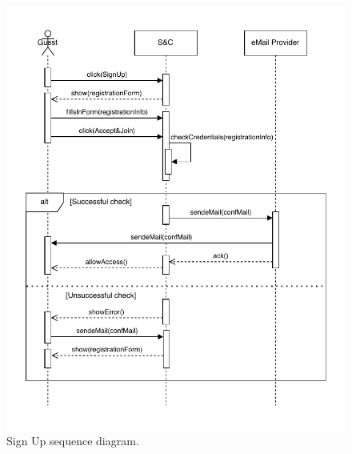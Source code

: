 \begin{figure}[H]
    \begin{center}
        \includegraphics[width=\linewidth]{Images/SequenceDiagram/SignUpSD.pdf}
        \caption{Sign Up sequence diagram.}
        \label{fig:sign_up_seqdiag}%
    \end{center}
\end{figure}


